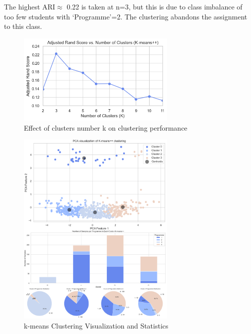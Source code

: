 \documentclass[journal]{IEEEtai}
\begin{document}
The highest ARI$\approx$ 0.22 is taken at n=3, but this is due to class imbalance of too few students with `Programme'=2. The clustering abandons the assignment to this class.
\begin{figure}[htbp]
	\centerline{\includegraphics[width=18pc]{ARI_vs_k_k-means.png}}
	\caption{Effect of clusters number k on clustering performance}
\end{figure}

\begin{figure}[htbp]
	\centerline{\includegraphics[width=18pc]{k-means-sum.png}}
	\caption{k-means Clustering Visualization and Statistics}
\end{figure}
\end{document}
